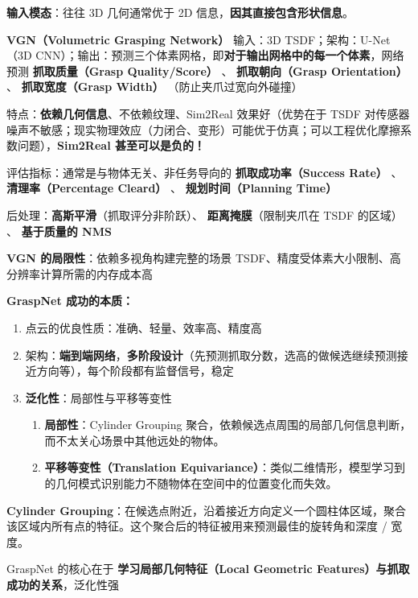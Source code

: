 \documentclass[
  8pt]{extarticle}
\providecommand{\tightlist}{%
  \setlength{\itemsep}{0pt}\setlength{\parskip}{0pt}}
\begin{document}
\begin{multicols*}{4}
\textbf{输入模态}：往往 3D 几何通常优于 2D
信息，\textbf{因其直接包含形状信息}。

\textbf{VGN（Volumetric Grasping Network）} 输入：3D
TSDF；架构：U-Net（3D
CNN）；输出：预测三个体素网格，即\textbf{对于输出网格中的每一个体素}，网络预测
\textbf{抓取质量（Grasp Quality/Score）} 、 \textbf{抓取朝向（Grasp
Orientation）} 、 \textbf{抓取宽度（Grasp Width）}
（防止夹爪过宽向外碰撞）

特点：\textbf{依赖几何信息}、不依赖纹理、Sim2Real 效果好（优势在于 TSDF
对传感器噪声不敏感；现实物理效应（力闭合、变形）可能优于仿真；可以工程优化摩擦系数问题），\textbf{Sim2Real
甚至可以是负的！}

评估指标：通常是与物体无关、非任务导向的 \textbf{抓取成功率（Success
Rate）} 、 \textbf{清理率（Percentage Cleard）} 、
\textbf{规划时间（Planning Time）}

后处理：\textbf{高斯平滑}（抓取评分非阶跃）、
\textbf{距离掩膜}（限制夹爪在 TSDF 的区域） 、 \textbf{基于质量的 NMS}

\textbf{VGN 的局限性}：依赖多视角构建完整的场景
TSDF、精度受体素大小限制、高分辨率计算所需的内存成本高

\textbf{GraspNet 成功的本质：}

\begin{enumerate}
\def\labelenumi{\arabic{enumi}.}
\tightlist
\item
  点云的优良性质：准确、轻量、效率高、精度高
\item
  架构：\textbf{端到端网络}，\textbf{多阶段设计}（先预测抓取分数，选高的做候选继续预测接近方向等），每个阶段都有监督信号，稳定
\item
  \textbf{泛化性}：局部性与平移等变性

  \begin{enumerate}
  \def\labelenumii{\arabic{enumii}.}
  \tightlist
  \item
    \textbf{局部性}：Cylinder Grouping
    聚合，依赖候选点周围的局部几何信息判断，而不太关心场景中其他远处的物体。
  \item
    \textbf{平移等变性（Translation
    Equivariance）}：类似二维情形，模型学习到的几何模式识别能力不随物体在空间中的位置变化而失效。
  \end{enumerate}
\end{enumerate}

\textbf{Cylinder
Grouping}：在候选点附近，沿着接近方向定义一个圆柱体区域，聚合该区域内所有点的特征。这个聚合后的特征被用来预测最佳的旋转角和深度
/ 宽度。

GraspNet 的核心在于 \textbf{学习局部几何特征（Local Geometric
Features）与抓取成功的关系}，泛化性强


\end{multicols*}
\end{document}
